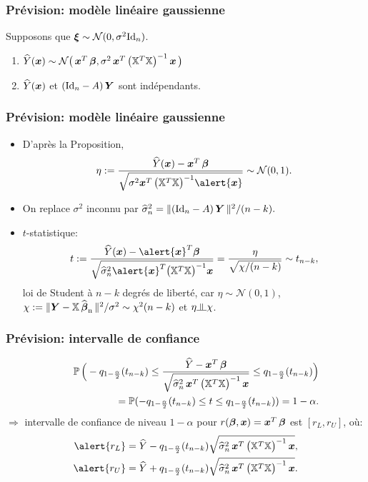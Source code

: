 \begin{frame}
\frametitle{Prévision: modèle linéaire gaussienne}
\begin{prop}
Supposons que $\boldsymbol{\xi} \sim {\mathcal N}(0,\sigma^2\mathrm{Id}_n)$.
\begin{enumerate}
\item $\widehat{Y}(\operatorname{\boldsymbol{x}}) \sim {\mathcal N}\big(\operatorname{\boldsymbol{x}} ^T\boldsymbol{\beta}, \sigma^2 \operatorname{\boldsymbol{x}}^T \big(\mathbb{X}^T\mathbb{X}\big)^{-1} \operatorname{\boldsymbol{x}} \big)$
\item $\widehat{Y}(\operatorname{\boldsymbol{x}})$ et $(\mathrm{Id}_{n} - A) \operatorname{\boldsymbol{Y}}$ sont
indépendants.
\end{enumerate}
\end{prop}
\end{frame}

\begin{frame}
\frametitle{Prévision: modèle linéaire gaussienne}
\begin{itemize}
\item D'après la Proposition,
$$
\eta:=\frac{\widehat{Y}(\bx) - \bx^T\truebeta}{\sqrt{\sigma^2 {\bx^T\big(\regressmat^T\regressmat\big)^{-1}\alert{\bx}}}}
\sim {\mathcal N}(0,1).
$$
\item On replace $\sigma^2$ inconnu par $\widehat \sigma_n^2 =
{\|(\mathrm{Id}_{n}-A) \operatorname{\boldsymbol{Y}} \|^2}/({n-k}).$
\item \alert{$t$-statistique:}
$$
t:= \frac{\widehat{Y}(\bx) -\alert{\bx}^T\truebeta}{\sqrt{\widehat
\sigma_n^2 \alert{\bx}^T\big(\regressmat^T\regressmat\big)^{-1}{
\bx}}}=\frac{\eta}{\sqrt{\chi/(n-k)}}\sim t_{n-k},
$$
\alert{loi de Student à $n-k$ degrés de liberté}, car $\eta\sim
{\mathcal N}(0,1)$, $\chi:=\|\boldsymbol{Y}-\mathbb{X}
\operatorname{\widehat{\boldsymbol{\beta}}_n}\|^2/\sigma^2\sim \chi^2(n-k)$ et $\eta \indep \chi$.
\end{itemize}
\end{frame}

\begin{frame}
\frametitle{Prévision: intervalle de confiance}
\begin{eqnarray*}
&&\operatorname{{\mathbb P}} \Big(-q_{1-\frac{\alpha}{2}}(t_{n-k}) \le \frac{\widehat Y
- \operatorname{\boldsymbol{x}}^T\boldsymbol{\beta}} {\sqrt{\widehat \sigma_n^2  \operatorname{\boldsymbol{x}}^T\big(\mathbb{X}^T\mathbb{X}\big)^{-1} \operatorname{\boldsymbol{x}} }}\le
q_{1-\frac{\alpha}{2}}(t_{n-k})\Big) \\\hspace{4mm} &&= \operatorname{{\mathbb P}}(-
q_{1-\frac{\alpha}{2}}(t_{n-k}) \le t\le
q_{1-\frac{\alpha}{2}}(t_{n-k})) = 1-\alpha.
\end{eqnarray*}
$\Longrightarrow$ \alert{intervalle de confiance} de niveau
$1-\alpha$ pour $r(\boldsymbol{\beta},\operatorname{\boldsymbol{x}})=\operatorname{\boldsymbol{x}}^T\boldsymbol{\beta}$ est
\alert{$[r_L, r_U]$}, o\`u:
\begin{align*}
\alert{r_L}&=\widehat Y -
q_{1-\frac{\alpha}{2}}(t_{n-k})\sqrt{\widehat \sigma_n^2
\bx^T\big(\regressmat^T\regressmat\big)^{-1}\bx},\\
\alert{r_U}&= \widehat Y +
q_{1-\frac{\alpha}{2}}(t_{n-k})\sqrt{\widehat \sigma_n^2 \bx^T\big(\regressmat^T\regressmat\big)^{-1} \bx}.
\end{align*}
\end{frame}



